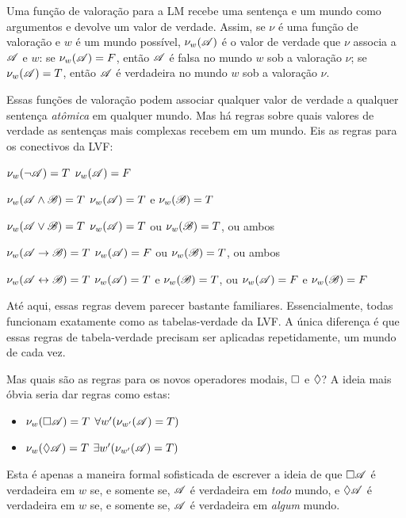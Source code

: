 Uma função de valoração para a LM recebe uma sentença e um mundo como argumentos e devolve um valor de verdade. Assim, se $\nu$ é uma função de valoração e $w$ é um mundo possível, $\nu_w(\mathscr{A})$ é o valor de verdade que $\nu$ associa a $\mathscr{A}$ e $w$: se $\nu_w(\mathscr{A})=F$, então $\mathscr{A}$ é falsa no mundo $w$ sob a valoração $\nu$; se $\nu_w(\mathscr{A})=T$, então $\mathscr{A}$ é verdadeira no mundo $w$ sob a valoração $\nu$.

Essas funções de valoração podem associar qualquer valor de verdade a qualquer sentença \emph{atômica} em qualquer mundo. Mas há regras sobre quais valores de verdade as sentenças mais complexas recebem em um mundo. Eis as regras para os conectivos da LVF:
\begin{compactlist}
	\item $\nu_w(\neg\mathscr{A})=T$ \ifeff{} $\nu_w(\mathscr{A})=F$
	\item $\nu_w(\mathscr{A}\wedge\mathscr{B})=T$ \ifeff{} $\nu_w(\mathscr{A})=T$ e $\nu_w(\mathscr{B})=T$
	\item $\nu_w(\mathscr{A}\vee\mathscr{B})=T$ \ifeff{} $\nu_w(\mathscr{A})=T$ ou $\nu_w(\mathscr{B})=T$, ou ambos
	\item $\nu_w(\mathscr{A}\rightarrow\mathscr{B})=T$ \ifeff{} $\nu_w(\mathscr{A})=F$ ou $\nu_w(\mathscr{B})=T$, ou ambos
	\item $\nu_w(\mathscr{A}\leftrightarrow\mathscr{B})=T$ \ifeff{} $\nu_w(\mathscr{A})=T$ e $\nu_w(\mathscr{B})=T$, ou $\nu_w(\mathscr{A})=F$ e $\nu_w(\mathscr{B})=F$
\end{compactlist}
Até aqui, essas regras devem parecer bastante familiares. Essencialmente, todas funcionam exatamente como as tabelas-verdade da LVF. A única diferença é que essas regras de tabela-verdade precisam ser aplicadas repetidamente, um mundo de cada vez.

Mas quais são as regras para os novos operadores modais, $\Box$ e $\Diamond$? A ideia mais óbvia seria dar regras como estas:
\begin{itemize}
	\item $\nu_w(\Box \mathscr{A})=T$ \ifeff{} $\forall w' (\nu_{w'}(\mathscr{A})=T)$
	\item $\nu_w(\Diamond \mathscr{A})=T$ \ifeff{} $\exists w' (\nu_{w'}(\mathscr{A})=T)$
\end{itemize}
Esta é apenas a maneira formal sofisticada de escrever a ideia de que $\Box\mathscr{A}$ é verdadeira em $w$ se, e somente se, $\mathscr{A}$ é verdadeira em \emph{todo} mundo, e $\Diamond\mathscr{A}$ é verdadeira em $w$ se, e somente se, $\mathscr{A}$ é verdadeira em \emph{algum} mundo.


